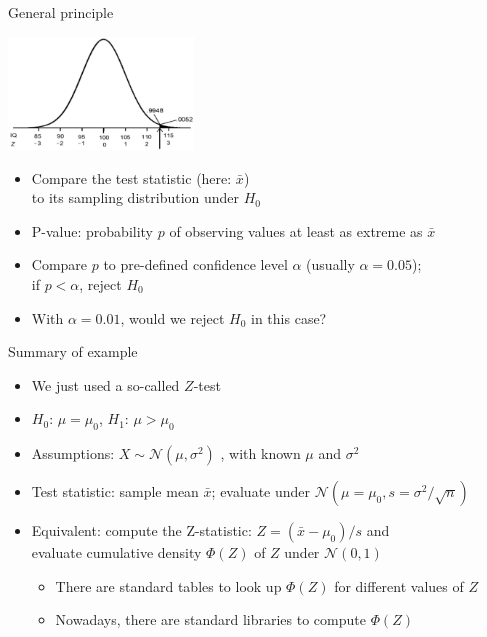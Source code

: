 \begin{frame}[c]{General principle}

\vspace*{-0.2cm}
\begin{center}
\includegraphics[height=3cm]{images/z_test_2.png}
\end{center}
\vspace*{-0.2cm}

\begin{itemize}
\item Compare the test statistic (here: $\bar{x}$)\\to its sampling
distribution under $H_0$
\pause 
\medskip
\item \alert{P-value}: probability $p$ of observing values \alert{at least as extreme as $\bar{x}$}\\
\pause 
\medskip
\item Compare $p$ to pre-defined confidence level $\alpha$ (usually
$\alpha=0.05$);\\\alert{if $p < \alpha$, reject $H_0$}
\pause 
\medskip
\item With $\alpha = 0.01$, would we reject $H_0$ in this case? \hands
\end{itemize}

\end{frame}
\begin{frame}[c]{Summary of example}

\begin{itemize}
\item We just used a so-called \alert{$Z$-test}
\item $H_0$: $\mu=\mu_0$, $H_1$: $\mu>\mu_0$  
\item Assumptions: $X \sim \mathcal{N}(\mu,\sigma^2)$ , with known $\mu$ and $\sigma^2$

\medskip
\pause
\item \alert{Test statistic}: sample mean $\bar{x}$; evaluate under 
$\mathcal{N}(\mu=\mu_0,s=\sigma^2/\sqrt{n})$
\pause
\smallskip
\item Equivalent: compute the \alert{Z-statistic}: $Z = (\bar{x}-\mu_0)/s$
and\\
evaluate cumulative density $\Phi(Z)$ of $Z$
under $\mathcal{N}(0,1)$
\medskip
\pause
\begin{itemize}
\item There are standard tables to look up $\Phi(Z)$ for different values of $Z$
\item Nowadays, there are standard libraries to compute $\Phi(Z)$
\end{itemize}

\end{itemize}

\end{frame}
